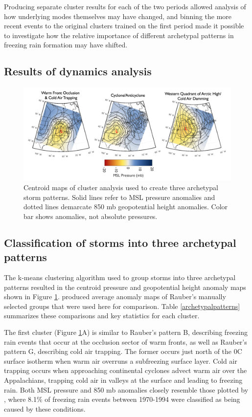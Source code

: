 \documentclass[twocol]{ametsoc}
\begin{document}
Producing separate cluster results for each of the two periods allowed analysis of how underlying modes themselves may have changed, and binning the more recent events to the original clusters trained on the first period made it possible to investigate how the relative importance of different archetypal patterns in freezing rain formation may have shifted.

\subsection{Results of dynamics analysis}

\begin{figure}
\centering
\includegraphics[width=1\textwidth]{Cluster_Centroids.png}
\caption{\label{fig:centroids} Centroid maps of cluster analysis  used to create three archetypal storm patterns. Solid lines refer to MSL pressure anomalies and dotted lines demarcate 850 mb geopotential height anomalies. Color bar shows anomalies, not absolute pressures.}
\end{figure}

\subsection{Classification of storms into three archetypal patterns}
The k-means clustering algorithm used to group storms into three archetypal patterns resulted in the centroid pressure and geopotential height anomaly maps shown in Figure \ref{fig:centroids}. \citet{erfani2012automated} produced average anomaly maps of Rauber's manually selected groups that were used here for comparison. Table \ref{archetypalpatterns} summarizes these comparisons and key statistics for each cluster.

The first cluster (Figure \ref{fig:centroids}A) is similar to Rauber's pattern B, describing freezing rain events that occur at the occlusion sector of warm fronts, as well as Rauber's pattern G, describing cold air trapping. The former occurs just north of the 0\degree C surface isotherm when warm air overruns a subfreezing surface layer. Cold air trapping occurs when approaching continental cyclones advect warm air over the Appalachians, trapping cold air in valleys at the surface and leading to freezing rain. Both MSL pressure and 850 mb anomalies closely resemble those plotted by \citet{rauber2001synoptic}, where  8.1\% of freezing rain events between 1970-1994 were classified as being caused by these conditions. 
\end{document}
